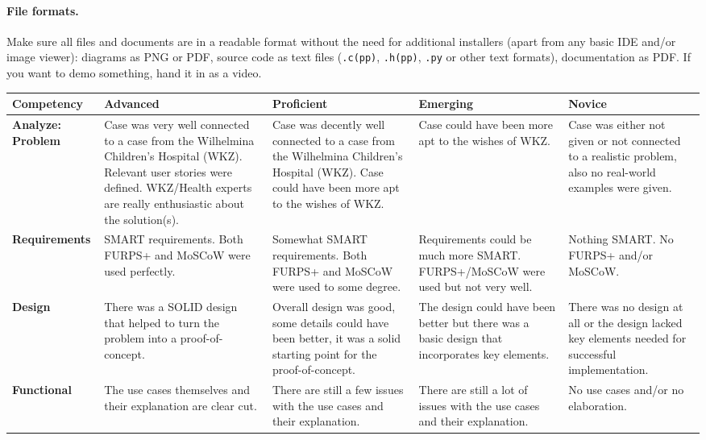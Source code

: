 \documentclass[11pt,a4paper]{article}
\begin{document}
\paragraph{File formats.} Make sure all files and documents are in a readable
format without the need for additional installers (apart from any basic IDE
and/or image viewer): diagrams as PNG or PDF, source code as text files
(\texttt{.c(pp)}, \texttt{.h(pp)}, \texttt{.py} or other text formats),
documentation as PDF. If you want to demo something, hand it in as a video.

\begin{landscape}
\begin{table}[p]
\centering
\scriptsize
\renewcommand{\arraystretch}{1.25}
\begin{tabularx}{\linewidth}{@{}>{\raggedright\arraybackslash}p{3.2cm} *{4}{>{\raggedright\arraybackslash}X}@{}}
\toprule
\textbf{Competency} & \textbf{Advanced} & \textbf{Proficient} & \textbf{Emerging} & \textbf{Novice} \\
\midrule
\textbf{Analyze: Problem} & Case was very well connected to a case from the Wilhelmina Children's Hospital (WKZ). Relevant user stories were defined. WKZ/Health experts are really enthusiastic about the solution(s). & Case was decently well connected to a case from the Wilhelmina Children's Hospital (WKZ). Case could have been more apt to the wishes of WKZ. & Case could have been more apt to the wishes of WKZ. & Case was either not given or not connected to a realistic problem, also no real-world examples were given. \\
\textbf{Requirements} & SMART requirements. Both FURPS+ and MoSCoW were used perfectly. & Somewhat SMART requirements. Both FURPS+ and MoSCoW were used to some degree. & Requirements could be much more SMART. FURPS+/MoSCoW were used but not very well. & Nothing SMART. No FURPS+ and/or MoSCoW. \\
\textbf{Design} & There was a SOLID design that helped to turn the problem into a proof-of-concept. & Overall design was good, some details could have been better, it was a solid starting point for the proof-of-concept. & The design could have been better but there was a basic design that incorporates key elements. & There was no design at all or the design lacked key elements needed for successful implementation. \\
\textbf{Functional} & The use cases themselves and their explanation are clear cut. & There are still a few issues with the use cases and their explanation. & There are still a lot of issues with the use cases and their explanation. & No use cases and/or no elaboration. \\

\end{tabularx}
\end{table}
\end{landscape}
\end{document}
